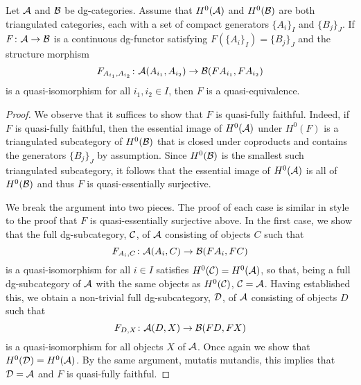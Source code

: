 
\begin{lemma} \label{lemma: quasi-equivalence on gens is quasi-equivalence}
  Let \(\mathcal{A}\) and \(\mathcal{B}\) be dg-categories.
  Assume that \(H^0(\mathcal{A})\) and \(H^0(\mathcal{B})\) are both triangulated categories, each with a set of compact generators \(\{A_i\}_I\) and \(\{B_j\}_J\).
  If \(F \colon \mathcal{A} \to \mathcal{B}\) is a continuous dg-functor satisfying \(F(\{A_i\}_I) = \{B_j\}_J\) and the structure morphism
  \[F_{A_{i_1}, A_{i_2}} \colon \mathcal{A}(A_{i_1}, A_{i_2}) \to \mathcal{B}(FA_{i_1}, FA_{i_2})\]
  is a quasi-isomorphism for all \(i_1, i_2 \in I\), then \(F\) is a quasi-equivalence.
\end{lemma}

\begin{proof}
  We observe that it suffices to show that \(F\) is quasi-fully faithful.
  Indeed, if \(F\) is quasi-fully faithful, then the essential image of \(H^0(\mathcal{A})\) under \(H^0(F)\) is a triangulated subcategory of \(H^0(\mathcal{B})\) that is closed under coproducts and contains the generators \(\{B_j\}_J\) by assumption.
  Since \(H^0(\mathcal{B})\) is the smallest such triangulated subcategory, it follows that the essential image of \(H^0(\mathcal{A})\) is all of \(H^0(\mathcal{B})\) and thus \(F\) is quasi-essentially surjective.

  We break the argument into two pieces.
  The proof of each case is similar in style to the proof that \(F\) is quasi-essentially surjective above.
  In the first case, we show that the full dg-subcategory, \(\mathcal{C}\), of \(\mathcal{A}\) consisting of objects \(C\) such that
  \[F_{A_i,C} \colon \mathcal{A}(A_i, C) \to \mathcal{B}(FA_i, FC)\]
  is a quasi-isomorphism for all \(i \in I\) satisfies \(H^0(\mathcal{C}) = H^0(\mathcal{A})\), so that, being a full dg-subcategory of \(\mathcal{A}\) with the same objects as \(H^0(\mathcal{C})\), \(\mathcal{C} = \mathcal{A}\).
  Having established this, we obtain a non-trivial full dg-subcategory, \(\mathcal{D}\), of \(\mathcal{A}\) consisting of objects \(D\) such that
  \[F_{D,X} \colon \mathcal{A}(D,X) \to \mathcal{B}(FD, FX)\]
  is a quasi-isomorphism for all objects \(X\) of \(\mathcal{A}\).
  Once again we show that \(H^0(\mathcal{D}) = H^0(\mathcal{A})\).
  By the same argument, mutatis mutandis, this implies that \(\mathcal{D} = \mathcal{A}\) and \(F\) is quasi-fully faithful.
  

\end{proof}

